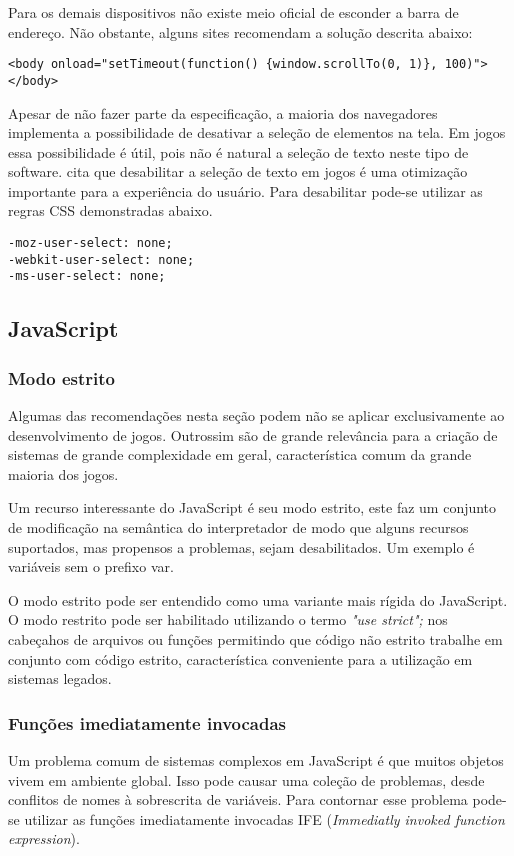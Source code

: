 \begin{draft}
Para os demais dispositivos não existe meio oficial de esconder a barra
de endereço. Não obstante, alguns sites recomendam a solução descrita abaixo:

\begin{verbatim}
<body onload="setTimeout(function() {window.scrollTo(0, 1)}, 100)">
</body>
\end{verbatim}

Apesar de não fazer parte da especificação, a maioria dos navegadores
implementa a possibilidade de desativar a seleção de elementos na tela.
Em jogos essa possibilidade é útil, pois não é natural a seleção de texto
neste tipo de software. \cite{html5mostwanted} cita que desabilitar
a seleção de texto em jogos é uma otimização importante para a
experiência do usuário. Para desabilitar pode-se utilizar as regras
CSS demonstradas abaixo.

\begin{verbatim}
-moz-user-select: none;
-webkit-user-select: none;
-ms-user-select: none;
\end{verbatim}

\subsection{JavaScript}
\subsubsection{Modo estrito}
Algumas das recomendações nesta seção podem não se aplicar
exclusivamente ao desenvolvimento de jogos. Outrossim são de grande
relevância para a criação de sistemas de grande complexidade em geral,
característica comum da grande maioria dos jogos.

Um recurso interessante do JavaScript é seu modo estrito, este faz
um conjunto de modificação na semântica do interpretador de modo
que alguns recursos suportados, mas propensos a problemas, sejam
desabilitados. Um exemplo é variáveis sem o prefixo var.

O modo estrito pode ser entendido como uma variante mais rígida
do JavaScript. O modo restrito pode ser habilitado utilizando o
termo \textit{"use strict";} nos cabeçahos de arquivos ou funções
permitindo que código não estrito trabalhe em conjunto com código
estrito, característica conveniente para a utilização em sistemas
legados.

\subsubsection{Funções imediatamente invocadas}

Um problema comum de sistemas complexos em JavaScript é que muitos
objetos vivem em ambiente global. Isso pode causar uma coleção de
problemas, desde conflitos de nomes à sobrescrita de variáveis. Para
contornar esse problema pode-se utilizar as funções imediatamente
invocadas IFE (\textit{Immediatly invoked function expression}).
\end{draft}

